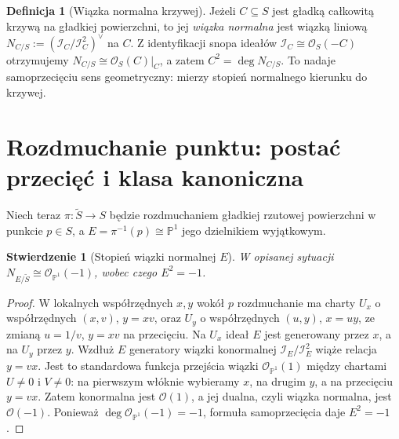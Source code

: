 \documentclass[11pt,a4paper,openany]{report}
\numberwithin{equation}{section}
\theoremstyle{plain}
\newtheorem{stwierdzenie}[twierdzenie]{Stwierdzenie}
\theoremstyle{definition}
\newtheorem{definicja}[twierdzenie]{Definicja}
\theoremstyle{remark}
\newcommand{\PP}{\mathbb P}
\begin{document}
\begin{definicja}[Wiązka normalna krzywej]
Jeżeli $C\subseteq S$ jest gładką całkowitą krzywą
na gładkiej powierzchni, to jej \emph{wiązka normalna}
jest wiązką liniową
$N_{C/S}:=(\mathcal I_C/\mathcal I_C^2)^\vee$ na $C$.
Z identyfikacji snopa ideałów $\mathcal I_C\cong\mathcal O_S(-C)$
otrzymujemy $N_{C/S}\cong\mathcal O_S(C)|_C$, a zatem
$C^2=\deg N_{C/S}$. To nadaje samoprzecięciu sens
geometryczny: mierzy stopień normalnego kierunku do krzywej.
\end{definicja}

\section{Rozdmuchanie punktu: postać przecięć i klasa kanoniczna}
\label{sec:ga6-blowup}

Niech teraz $\pi:\widetilde S\to S$ będzie rozdmuchaniem
gładkiej rzutowej powierzchni w punkcie $p\in S$,
a $E=\pi^{-1}(p)\cong\PP^1$ jego dzielnikiem wyjątkowym.

\begin{stwierdzenie}[Stopień wiązki normalnej $E$]
\label{st:ga6-exceptional-normal}
W opisanej sytuacji $N_{E/\widetilde S}\cong\mathcal O_{\PP^1}(-1)$,
wobec czego $E^2=-1$.
\end{stwierdzenie}
\begin{proof}
W lokalnych współrzędnych $x,y$ wokół $p$ rozdmuchanie
ma charty $U_x$ o współrzędnych $(x,v)$, $y=xv$,
oraz $U_y$ o współrzędnych $(u,y)$, $x=uy$,
ze zmianą $u=1/v$, $y=xv$ na przecięciu.
Na $U_x$ ideał $E$ jest generowany przez $x$,
a na $U_y$ przez $y$. Wzdłuż $E$ generatory
wiązki konormalnej $\mathcal I_E/\mathcal I_E^2$
wiąże relacja $y=vx$. Jest to standardowa funkcja
przejścia wiązki $\mathcal O_{\PP^1}(1)$ między chartami
$U\ne0$ i $V\ne0$: na pierwszym włóknie wybieramy
$x$, na drugim $y$, a na przecięciu $y=vx$.
Zatem konormalna jest $\mathcal O(1)$, a jej dualna,
czyli wiązka normalna, jest $\mathcal O(-1)$.
Ponieważ $\deg\mathcal O_{\PP^1}(-1)=-1$,
formuła samoprzecięcia daje $E^2=-1$.
\end{proof}
\end{document}
